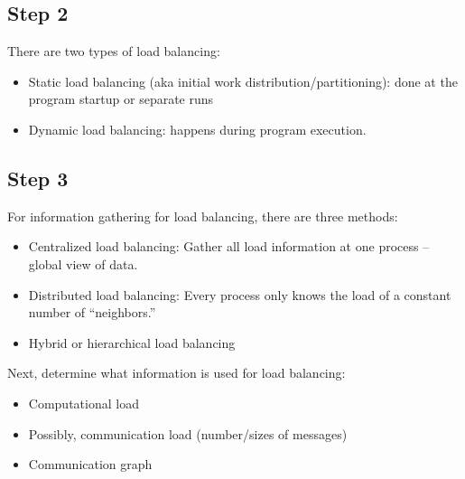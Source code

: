 \documentclass{article}
\begin{document}
\subsection{Step 2}
There are two types of load balancing:
\begin{itemize}
    \item Static load balancing (aka initial work distribution/partitioning): done at the program startup        or separate runs
    \item Dynamic load balancing: happens during program execution. 
\end{itemize}

\subsection{Step 3}
For information gathering for load balancing, there are three methods:
\begin{itemize}
    \item Centralized load balancing: Gather all load information at one process -- global view of data.
    \item Distributed load balancing: Every process only knows the load of a constant number of “neighbors.”
    \item Hybrid or hierarchical load balancing
\end{itemize}
Next, determine what information is used for load balancing:
\begin{itemize}
    \item Computational load
    \item Possibly, communication load (number/sizes of messages)
    \item Communication graph
\end{itemize}
\end{document}
